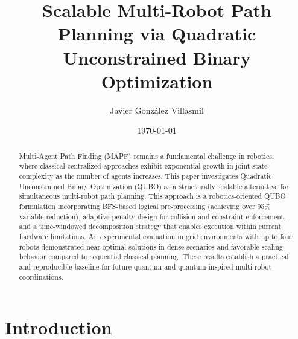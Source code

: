 \documentclass[11pt]{article}
\title{\textbf{Scalable Multi-Robot Path Planning via Quadratic Unconstrained Binary Optimization}}
\author{Javier González Villasmil}
\date{\today}
\begin{document}
\maketitle

\begin{abstract}

Multi-Agent Path Finding (MAPF) remains a fundamental challenge in robotics, where classical centralized approaches exhibit exponential growth in joint-state complexity  as the number of agents increases. This paper investigates Quadratic Unconstrained Binary Optimization (QUBO) as a structurally scalable alternative for simultaneous multi-robot path planning. This approach is a robotics-oriented QUBO formulation incorporating BFS-based logical pre-processing (achieving over 95\% variable reduction), adaptive penalty design for collision and constraint enforcement, and a time-windowed decomposition strategy that enables execution within current hardware limitations. An experimental evaluation in grid environments with up to four robots demonstrated near-optimal solutions in dense scenarios and favorable scaling behavior compared to sequential classical planning. These results establish a practical and reproducible baseline for future quantum and quantum-inspired multi-robot coordinations.

\end{abstract}

\section{Introduction}
\end{document}
